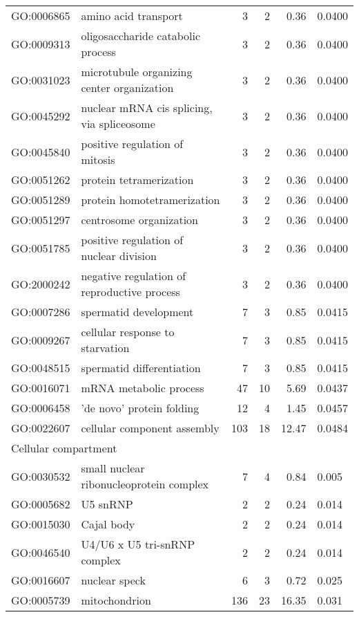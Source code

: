 \begin{longtable}{lp{4.5cm}rrrl}
  GO:0006865 & amino acid transport &   3 &   2 & 0.36 & 0.0400 \\ 
  GO:0009313 & oligosaccharide catabolic process &   3 &   2 & 0.36 & 0.0400 \\ 
  GO:0031023 & microtubule organizing center organization &   3 &   2 & 0.36 & 0.0400 \\ 
  GO:0045292 & nuclear mRNA cis splicing, via spliceosome &   3 &   2 & 0.36 & 0.0400 \\ 
  GO:0045840 & positive regulation of mitosis &   3 &   2 & 0.36 & 0.0400 \\ 
  GO:0051262 & protein tetramerization &   3 &   2 & 0.36 & 0.0400 \\ 
  GO:0051289 & protein homotetramerization &   3 &   2 & 0.36 & 0.0400 \\ 
  GO:0051297 & centrosome organization &   3 &   2 & 0.36 & 0.0400 \\ 
  GO:0051785 & positive regulation of nuclear division &   3 &   2 & 0.36 & 0.0400 \\ 
  GO:2000242 & negative regulation of reproductive process &   3 &   2 & 0.36 & 0.0400 \\ 
  GO:0007286 & spermatid development &   7 &   3 & 0.85 & 0.0415 \\ 
  GO:0009267 & cellular response to starvation &   7 &   3 & 0.85 & 0.0415 \\ 
  GO:0048515 & spermatid differentiation &   7 &   3 & 0.85 & 0.0415 \\ 
  GO:0016071 & mRNA metabolic process &  47 &  10 & 5.69 & 0.0437 \\ 
  GO:0006458 & 'de novo' protein folding &  12 &   4 & 1.45 & 0.0457 \\ 
  GO:0022607 & cellular component assembly & 103 &  18 & 12.47 & 0.0484 \\ 
  \hline
  \multicolumn{6}{l}{Cellular compartment}  \\ 
  GO:0030532 & small nuclear ribonucleoprotein complex &   7 &   4 & 0.84 & 0.005 \\ 
  GO:0005682 & U5 snRNP &   2 &   2 & 0.24 & 0.014 \\ 
  GO:0015030 & Cajal body &   2 &   2 & 0.24 & 0.014 \\ 
  GO:0046540 & U4/U6 x U5 tri-snRNP complex &   2 &   2 & 0.24 & 0.014 \\ 
  GO:0016607 & nuclear speck &   6 &   3 & 0.72 & 0.025 \\ 
  GO:0005739 & mitochondrion & 136 &  23 & 16.35 & 0.031 \\ 

\end{longtable}
